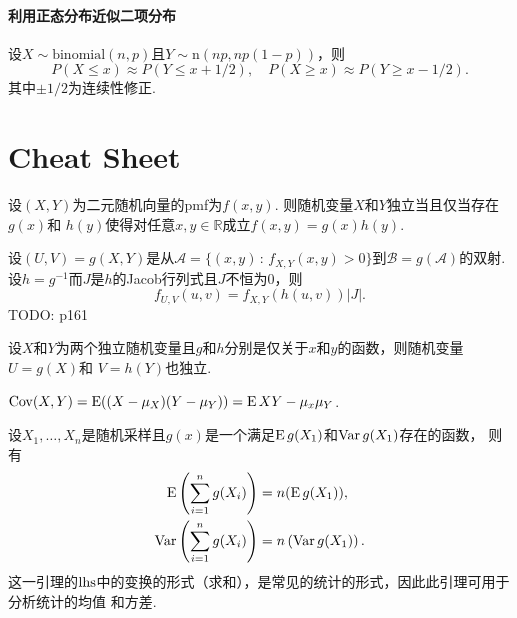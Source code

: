     \paragraph{利用正态分布近似二项分布}
    设$X\sim\text{binomial}(n, p)$且$Y\sim \text{n}(np, np(1-p))$，则
    \[
      P(X\le x)\approx P(Y\le x+1/2), \quad 
      P(X\ge x)\approx P(Y\ge x-1/2).
    \]
    其中$\pm 1/2$为连续性修正. 
  

\newpage
\section{Cheat Sheet}

  \begin{lemma}[独立]
    设$(X,Y)$为二元随机向量的pmf为$f(x,y)$. 则随机变量$X$和$Y$独立当且仅当存在$g(x)$和
    $h(y)$使得对任意$x,y\in\mathbb{R}$成立$f(x,y)=g(x)h(y)$.
  \end{lemma}

  \begin{thm}[变换的pdf]
    设$(U,V)=g(X,Y)$是从$\mathcal{A}=\{(x,y)\,:\,f_{X,Y}(x,y)>0\}$到$\mathcal{B}=
    g(\mathcal{A})$的双射. 设$h=g^{-1}$而$J$是$h$的Jacob行列式且$J$不恒为$0$，则
    \[
      f_{U,V}(u,v) = f_{X,Y}(h(u, v))|J|.
    \]
    TODO: p161
  \end{thm}

  \begin{lemma}[独立]
    设$X$和$Y$为两个独立随机变量且$g$和$h$分别是仅关于$x$和$y$的函数，则随机变量$U=g(X)$和
    $V=h(Y)$也独立. 
  \end{lemma}

  \begin{lemma}[协方差]
    $\operatorname{Cov}(X,Y) = \operatorname{E}((X-\mu_X)(Y-\mu_Y)) = \operatorname{E} XY - \mu_x\mu_Y$.
  \end{lemma}

  \begin{lemma}
    设$X_1,\dots,X_n$是随机采样且$g(x)$是一个满足$\operatorname{E} g(X_1)$和$\operatorname{Var} g(X_1)$存在的函数，
    则有
    \begin{align*}
      \operatorname{E}\left(\sum_{i=1}^n g(X_i) \right) &= n(\operatorname{E} g(X_1)), \\
      \operatorname{Var}\left( \sum_{i=1}^n g(X_i) \right) &= n\left(\operatorname{Var} g(X_1) \right).
    \end{align*}
    这一引理的$\text{lhs}$中的变换的形式（求和），是常见的统计的形式，因此此引理可用于分析统计的均值
    和方差. 
  \end{lemma}


